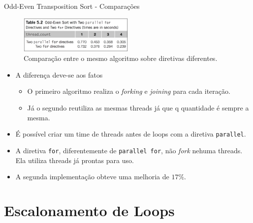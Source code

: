	\begin{frame}{Odd-Even Transposition Sort - Comparações}
		\begin{figure}[p]
			\centering
			\includegraphics[width=0.5\textwidth]{img/pacheco/odd-even_comparation.png}
			\caption{Comparação entre o mesmo algoritmo sobre diretivas diferentes.}
		\end{figure}
		\begin{itemize}
			\item A diferença deve-se aos fatos
			\begin{itemize}
				\item O primeiro algoritmo realiza o \textit{forking} e \textit{joining} para cada iteração.
				\item Já o segundo reutiliza as mesmas threads já que q quantidade é sempre a mesma.
			\end{itemize}
			\item É possível criar um time de threads antes de loops com a diretiva {\tt parallel}.
			\item A diretiva {\tt for}, diferentemente de {\tt parallel for}, não \textit{fork} nehuma threads. Ela utiliza threads já prontas para uso.
			\item A segunda implementação obteve uma melhoria de $17\%$.
		\end{itemize}
	\end{frame}








\section{Escalonamento de Loops}
